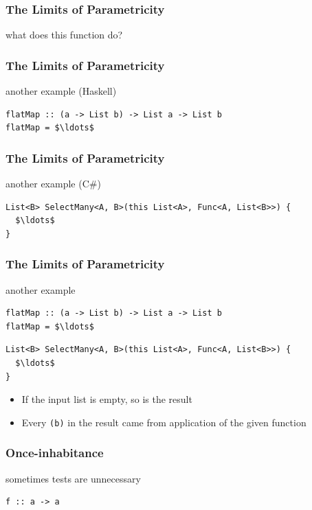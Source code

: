 \begin{frame}[fragile]
\frametitle{The Limits of Parametricity}
\begin{block}{what does this function do?}

\end{block}
\end{frame}

\begin{frame}[fragile]
\frametitle{The Limits of Parametricity}
\begin{block}{another example (Haskell)}
\begin{lstlisting}[style=haskell,mathescape]
flatMap :: (a -> List b) -> List a -> List b
flatMap = $\ldots$
\end{lstlisting}
\end{block}
\end{frame}

\begin{frame}[fragile]
\frametitle{The Limits of Parametricity}
\begin{block}{another example (C\#)}
\begin{lstlisting}[style=csharp,mathescape]
List<B> SelectMany<A, B>(this List<A>, Func<A, List<B>>) {
  $\ldots$
}
\end{lstlisting}
\end{block}
\end{frame}

\begin{frame}[fragile]
\frametitle{The Limits of Parametricity}
\begin{block}{another example}
\begin{lstlisting}[style=haskell,mathescape]
flatMap :: (a -> List b) -> List a -> List b
flatMap = $\ldots$
\end{lstlisting}
\begin{lstlisting}[style=csharp,mathescape]
List<B> SelectMany<A, B>(this List<A>, Func<A, List<B>>) {
  $\ldots$
}
\end{lstlisting}
\end{block}
\begin{itemize}
  \item If the input list is empty, so is the result
  \item Every \lstinline{(b)} in the result came from application of the given function
\end{itemize}
\end{frame}

\begin{frame}[fragile]
\frametitle{Once-inhabitance}
\begin{block}{sometimes tests are unnecessary}
\begin{lstlisting}[style=haskell]
f :: a -> a
\end{lstlisting}
\end{block}
\end{frame}

